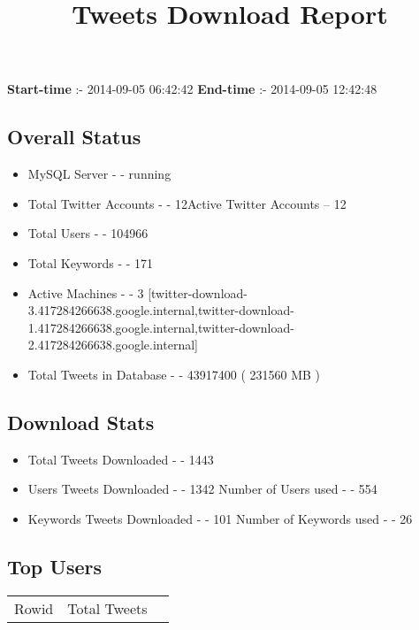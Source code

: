 \documentclass{article}\usepackage[T1]{fontenc}
\begin{document}
\title{\textbf{Tweets Download Report}}
               \date{}
                \maketitle
               \centerline{\textbf{Start-time} :- 2014-09-05 06:42:42 \hspace{40pt} \textbf{End-time} :- 2014-09-05 12:42:48}               \subsection*{Overall Status}                \begin{itemize}                \item MySQL Server - - running               \item Total Twitter Accounts - - 12\newline Active Twitter Accounts -- 12               \item Total Users - - 104966               \item Total Keywords - - 171               \item Active Machines - - 3 [twitter-download-3.417284266638.google.internal,twitter-download-1.417284266638.google.internal,twitter-download-2.417284266638.google.internal]               \item Total Tweets in Database - - 43917400 ( 231560 MB )               \end{itemize}               \subsection*{Download Stats}                \begin{itemize}                \item Total Tweets Downloaded - - 1443               \item Users Tweets Downloaded - - 1342 \newline Number of Users used - - 554               \item Keywords Tweets Downloaded - - 101 \newline Number of Keywords used - - 26              \end{itemize}              \subsection*{Top Users}\begin{tabular}{|c|c|c|}         \hline         Rowid & Total Tweets \\ 

\end{tabular}
\end{document}
